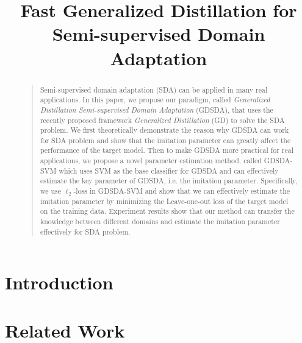 \documentclass[letterpaper]{article}
\begin{document}
%
\title{Fast Generalized Distillation for Semi-supervised Domain Adaptation}
\maketitle
\begin{abstract}
\begin{quote}
Semi-supervised domain adaptation (SDA) can be applied in many real applications. In this paper, we propose our paradigm, called \textit{Generalized Distillation Semi-supervised Domain Adaptation} (GDSDA), that uses the recently proposed framework \textit{Generalized Distillation} (GD) \cite{lopez2015unifying} to solve the SDA problem.
We first theoretically demonstrate the reason why GDSDA can work for SDA problem and show that the imitation parameter can greatly affect the performance of the target model. Then to make GDSDA more practical for real applications, we propose a novel parameter estimation method, called GDSDA-SVM which uses SVM as the base classifier for GDSDA and can effectively estimate the key parameter of GDSDA, i.e. the imitation parameter. Specifically, we use $\ell_2$-loss in GDSDA-SVM and show that we can effectively estimate the imitation parameter by minimizing the Leave-one-out loss of the target model on the training data. Experiment results show that our method can transfer the knowledge between different domains and estimate the imitation parameter effectively for SDA problem.
\end{quote}
\end{abstract}

\section{Introduction}


%

%

\section{Related Work}\label{sec:work}

\end{document}
